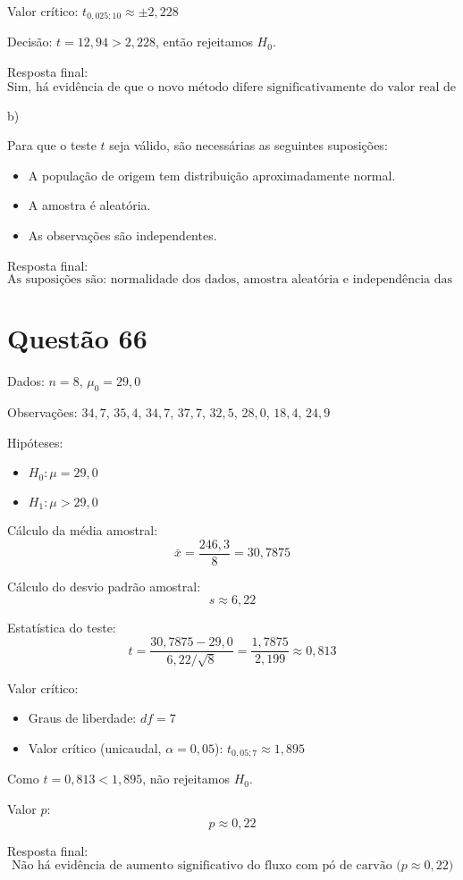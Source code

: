 \documentclass[12pt]{article}
\newcommand{\quest}[1]{\section*{Questão #1}} %
\begin{document}
Valor crítico: $t_{0{,}025; 10} \approx \pm 2{,}228$

Decisão: $t = 12{,}94 > 2{,}228$, então rejeitamos $H_0$.

Resposta final:
\[
\boxed{\text{Sim, há evidência de que o novo método difere significativamente do valor real de 548 mg/kg}}
\]

b)

Para que o teste $t$ seja válido, são necessárias as seguintes suposições:
\begin{itemize}
  \item A população de origem tem distribuição aproximadamente normal.
  \item A amostra é aleatória.
  \item As observações são independentes.
\end{itemize}

Resposta final:
\[
\boxed{\text{As suposições são: normalidade dos dados, amostra aleatória e independência das observações}}
\]

\quest{66}

Dados: $n = 8$, $\mu_0 = 29{,}0$

Observações: $34{,}7$, $35{,}4$, $34{,}7$, $37{,}7$, $32{,}5$, $28{,}0$, $18{,}4$, $24{,}9$

Hipóteses:
\begin{itemize}
  \item $H_0: \mu = 29{,}0$
  \item $H_1: \mu > 29{,}0$
\end{itemize}

Cálculo da média amostral:
\[
\bar{x} = \frac{246{,}3}{8} = 30{,}7875
\]

Cálculo do desvio padrão amostral:
\[
s \approx 6{,}22
\]

Estatística do teste:
\[
t = \frac{30{,}7875 - 29{,}0}{6{,}22 / \sqrt{8}} = \frac{1{,}7875}{2{,}199} \approx 0{,}813
\]

Valor crítico:
\begin{itemize}
  \item Graus de liberdade: $df = 7$
  \item Valor crítico (unicaudal, $\alpha = 0{,}05$): $t_{0{,}05; 7} \approx 1{,}895$
\end{itemize}

Como $t = 0{,}813 < 1{,}895$, não rejeitamos $H_0$.

Valor $p$:
\[
p \approx 0{,}22
\]

Resposta final:
\[
\boxed{\text{Não há evidência de aumento significativo do fluxo com pó de carvão ($p \approx 0{,}22$)}}
\]
\end{document}
